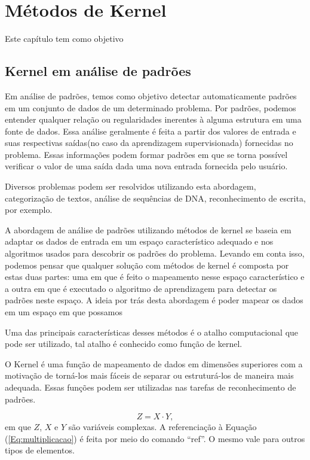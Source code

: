 \chapter{Métodos de Kernel}
\label{CAP2}


Este capítulo tem como objetivo 


\section{Kernel em análise de padrões}\label{Sub:equa}

Em análise de padrões, temos como objetivo detectar automaticamente padrões em um conjunto de dados de um determinado problema. Por padrões, podemos entender qualquer relação ou regularidades inerentes à alguma estrutura em uma fonte de dados. Essa análise geralmente é feita a partir dos valores de entrada e suas respectivas saídas(no caso da aprendizagem supervisionada) fornecidas no problema. Essas informações podem formar padrões em que se torna possível verificar o valor de uma saída dada uma nova entrada fornecida pelo usuário. 

Diversos problemas podem ser resolvidos utilizando esta abordagem, categorização de textos, análise de sequências de DNA, reconhecimento de escrita, por exemplo.

A abordagem de análise de padrões utilizando métodos de kernel se baseia em adaptar os dados de entrada em um espaço característico adequado e nos algoritmos usados para descobrir os padrões do problema. Levando em conta isso, podemos pensar que qualquer solução com métodos de kernel é composta por estas duas partes: uma em que é feito o mapeamento nesse espaço característico e a outra em que é executado o algoritmo de aprendizagem para detectar os padrões neste espaço. A ideia por trás desta abordagem é poder mapear os dados em um espaço em que possamos 

Uma das principais características desses métodos é o atalho computacional que pode ser utilizado, tal atalho é conhecido como função de kernel.


O Kernel  é uma função de mapeamento de dados em dimensões superiores com a motivação de torná-los mais fáceis de separar ou estruturá-los de maneira mais adequada. Essas funções podem ser utilizadas nas tarefas de reconhecimento de padrões. 

\begin{equation}\label{Eq:multiplicacao}
%
Z = X \cdot Y,
%
\end{equation}
%
em que $Z$, $X$ e $Y$ são variáveis complexas. A referenciação à Equação (\ref{Eq:multiplicacao}) é feita por meio do comando ``ref''. O mesmo vale para outros tipos de elementos.


